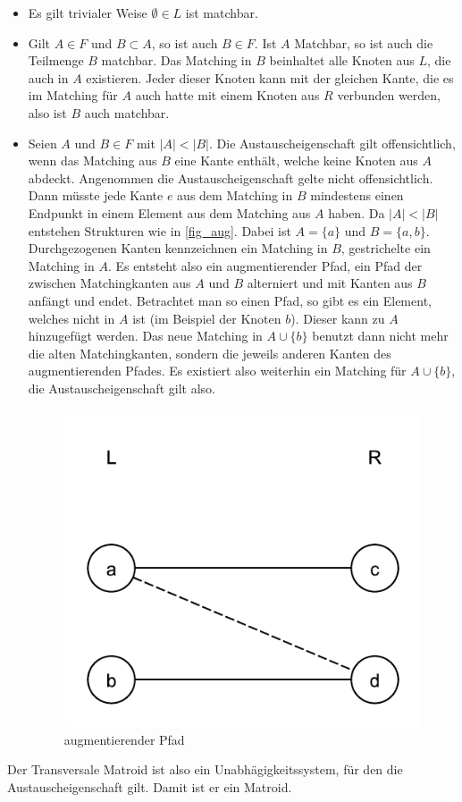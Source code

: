 \begin{itemize}
\item Es gilt trivialer Weise $\emptyset \in L$ ist matchbar.

\item Gilt $A \in F$ und $B \subset A$, so ist auch $B \in F$. Ist $A$ Matchbar, so ist auch die Teilmenge $B$ matchbar. Das Matching in $B$ beinhaltet alle Knoten aus $L$, die auch in $A$ existieren. Jeder dieser Knoten kann mit der gleichen Kante, die es im Matching für $A$ auch hatte mit einem Knoten aus $R$ verbunden werden, also ist $B$ auch matchbar.

\item Seien $A$ und $B \in F$ mit $|A| < |B|$. Die Austauscheigenschaft gilt offensichtlich, wenn das Matching aus $B$ eine Kante enthält, welche keine Knoten aus $A$ abdeckt. Angenommen die Austauscheigenschaft gelte nicht offensichtlich. Dann müsste jede Kante $e$ aus dem Matching in $B$ mindestens einen Endpunkt in einem Element aus dem Matching aus $A$ haben. Da $|A| < |B|$ entstehen Strukturen wie in \autoref{fig_aug}. Dabei ist $A=\{a\}$ und $B=\{a,b\}$. Durchgezogenen Kanten kennzeichnen ein Matching in $B$, gestrichelte ein Matching in $A$. Es entsteht also ein augmentierender Pfad, ein Pfad der zwischen Matchingkanten aus $A$ und $B$ alterniert und mit Kanten aus $B$ anfängt und endet. Betrachtet man so einen Pfad, so gibt es ein Element, welches nicht in $A$ ist (im Beispiel der Knoten $b$). Dieser kann zu $A$ hinzugefügt werden. Das neue Matching in $A \cup \{b\}$ benutzt dann nicht mehr die alten Matchingkanten, sondern die jeweils anderen Kanten des augmentierenden Pfades. Es existiert also weiterhin ein Matching für $A\cup \{b\}$, die Austauscheigenschaft gilt also.

\begin{figure}[h]
\center
\includegraphics[scale=0.5]{fig/aug}
\caption{augmentierender Pfad}
\label{fig_aug}
\end{figure}

\end{itemize}

Der Transversale Matroid ist also ein Unabhägigkeitssystem, für den die Austauscheigenschaft gilt. Damit ist er ein Matroid. 

\subexercise



